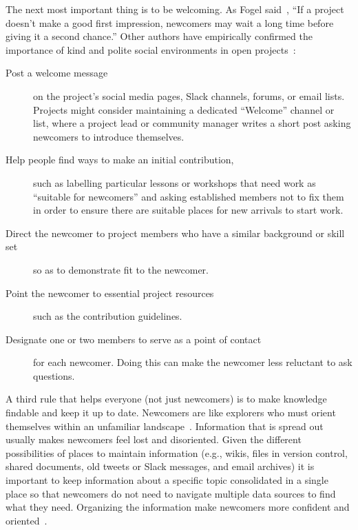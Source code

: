 The next most important thing is to be welcoming.
As Fogel said~\cite{Foge2005},
``If a project doesn't make a good first impression,
newcomers may wait a long time before giving it a second chance.''
Other authors have empirically confirmed the importance of kind and polite social environments
in open projects~\cite{Sing2012,Stei2013,Stei2018}:

\begin{description}

\item[Post a welcome message]
  on the project's social media pages, Slack channels, forums, or email lists.
  Projects might consider maintaining a dedicated ``Welcome'' channel or list,
  where a project lead or community manager writes a short post asking newcomers to introduce themselves.

\item[Help people find ways to make an initial contribution,]
  such as labelling particular lessons or workshops that need work as ``suitable for newcomers''
  and asking established members not to fix them
  in order to ensure there are suitable places for new arrivals to start work.

\item[Direct the newcomer to project members who have a similar background or skill set]
  so as to demonstrate fit to the newcomer.

\item[Point the newcomer to essential project resources]
  such as the contribution guidelines.

\item[Designate one or two members to serve as a point of contact]
  for each newcomer.
  Doing this can make the newcomer less reluctant to ask questions.

\end{description}

A third rule that helps everyone (not just newcomers)
is to make knowledge findable and keep it up to date.
Newcomers are like explorers who must orient themselves within an unfamiliar landscape~\cite{Dage2010}.
Information that is spread out usually makes newcomers feel lost and disoriented.
Given the different possibilities of places to maintain information
(e.g., wikis, files in version control, shared documents, old tweets or Slack messages, and email archives)
it is important to keep information about a specific topic consolidated in a single place
so that newcomers do not need to navigate multiple data sources to find what they need.
Organizing the information make newcomers more confident and oriented~\cite{Stei2016}.

